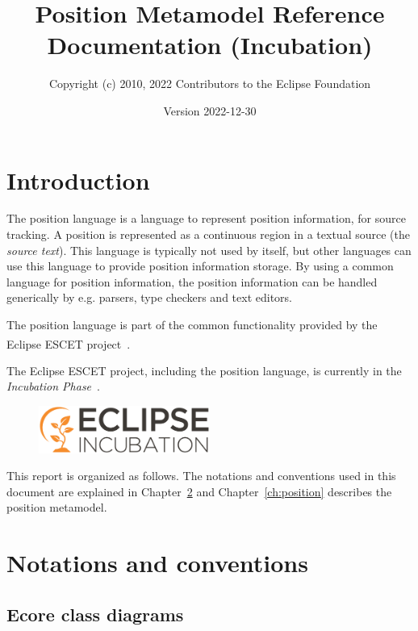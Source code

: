 \documentclass{report}
\title{Position Metamodel Reference Documentation (Incubation)}
\author{Copyright (c) 2010, 2022 Contributors to the Eclipse Foundation}
\date{Version 2022-12-30}
\begin{document}
\maketitle
\tableofcontents

\chapter{Introduction}
The position language is a language to represent position information, for
source tracking. A position is represented as a continuous region in a textual
source (the \emph{source text}). This language is typically not used by itself,
but other languages can use this language to provide position information
storage. By using a common language for position information, the position
information can be handled generically by e.g. parsers, type checkers and text
editors.

The position language is part of the common functionality provided by the
Eclipse ESCET\textsuperscript{\texttrademark{}} project~\cite{Eclipse:ESCET}.

The Eclipse ESCET project, including the position language, is
currently in the \emph{Incubation Phase}~\cite{Eclipse:Incubation}.
\begin{figure}[H]
  \centering
  \includegraphics[width=0.5\textwidth]{figures/eclipse-incubation.png}
\end{figure}



This report is organized as follows. The notations and conventions used in
this document are explained in Chapter~\ref{ch:notations-conventions} and
Chapter~\ref{ch:position} describes the position metamodel.


\chapter{Notations and conventions}\label{ch:notations-conventions}

\section{Ecore class diagrams}
\end{document}
